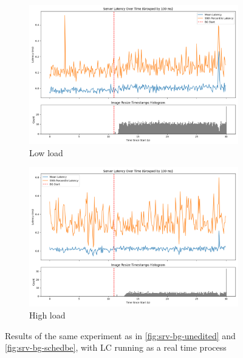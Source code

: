 \begin{figure}[t]
    \centering
    \begin{subfigure}[t]{0.48\columnwidth}
        \includegraphics[width=\columnwidth]{graphs/srv-bg-rt-low.png}
        \caption{Low load}\label{fig:srv-bg-rt-low}
    \end{subfigure}
    \hspace{\fill}
    \begin{subfigure}[t]{0.48\columnwidth}
        \includegraphics[width=\columnwidth]{graphs/srv-bg-rt-high.png}
        \caption{High load}\label{fig:srv-bg-rt-high}
    \end{subfigure}
    \vspace{4pt}
    \caption{Results of the same experiment as in \autoref{fig:srv-bg-unedited}
    and \autoref{fig:srv-bg-schedbe}, with LC running as a real time
    process}\label{fig:srv-bg-rt}
\end{figure}

